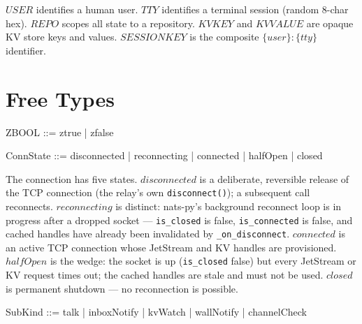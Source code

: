 \documentclass[a4paper,10pt,fleqn]{article}
\begin{document}
\begin{zed}
\end{zed}

$USER$ identifies a human user.  $TTY$ identifies a terminal
session (random 8-char hex).  $REPO$ scopes all state to a
repository.  $KVKEY$ and $KVVALUE$ are opaque KV store keys and
values.  $SESSIONKEY$ is the composite $\{user\}:\{tty\}$ identifier.

\section{Free Types}

\begin{zed}
  ZBOOL ::= ztrue | zfalse
\end{zed}

\begin{zed}
  ConnState ::= disconnected | reconnecting | connected | halfOpen | closed
\end{zed}

The connection has five states.  $disconnected$ is a deliberate,
reversible release of the TCP connection (the relay's own
\texttt{disconnect()}); a subsequent call reconnects.
$reconnecting$ is distinct: nats-py's background reconnect loop is
in progress after a dropped socket --- \texttt{is\_closed} is
false, \texttt{is\_connected} is false, and cached handles have
already been invalidated by \texttt{\_on\_disconnect}.
$connected$ is an active TCP connection whose JetStream and KV
handles are provisioned.  $halfOpen$ is the wedge: the socket is
up (\texttt{is\_closed} false) but every JetStream or KV request
times out; the cached handles are stale and must not be used.
$closed$ is permanent shutdown --- no reconnection is possible.

\begin{zed}
  SubKind ::= talk | inboxNotify | kvWatch | wallNotify | channelCheck
\end{zed}
\end{document}
